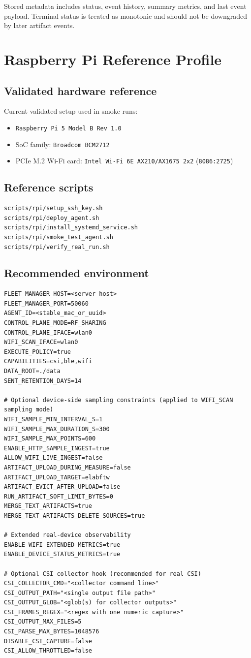 \documentclass[11pt,a4paper]{article}
\begin{document}
Stored metadata includes status, event history, summary metrics, and last event payload.
Terminal status is treated as monotonic and should not be downgraded by later artifact events.

\section{Raspberry Pi Reference Profile}
\subsection{Validated hardware reference}
Current validated setup used in smoke runs:
\begin{itemize}
  \item \texttt{Raspberry Pi 5 Model B Rev 1.0}
  \item SoC family: \texttt{Broadcom BCM2712}
  \item PCIe M.2 Wi-Fi card: \texttt{Intel Wi-Fi 6E AX210/AX1675 2x2} (\texttt{8086:2725})
\end{itemize}

\subsection{Reference scripts}
\begin{verbatim}
scripts/rpi/setup_ssh_key.sh
scripts/rpi/deploy_agent.sh
scripts/rpi/install_systemd_service.sh
scripts/rpi/smoke_test_agent.sh
scripts/rpi/verify_real_run.sh
\end{verbatim}

\subsection{Recommended environment}
\begin{verbatim}
FLEET_MANAGER_HOST=<server_host>
FLEET_MANAGER_PORT=50060
AGENT_ID=<stable_mac_or_uuid>
CONTROL_PLANE_MODE=RF_SHARING
CONTROL_PLANE_IFACE=wlan0
WIFI_SCAN_IFACE=wlan0
EXECUTE_POLICY=true
CAPABILITIES=csi,ble,wifi
DATA_ROOT=./data
SENT_RETENTION_DAYS=14

# Optional device-side sampling constraints (applied to WIFI_SCAN sampling mode)
WIFI_SAMPLE_MIN_INTERVAL_S=1
WIFI_SAMPLE_MAX_DURATION_S=300
WIFI_SAMPLE_MAX_POINTS=600
ENABLE_HTTP_SAMPLE_INGEST=true
ALLOW_WIFI_LIVE_INGEST=false
ARTIFACT_UPLOAD_DURING_MEASURE=false
ARTIFACT_UPLOAD_TARGET=elabftw
ARTIFACT_EVICT_AFTER_UPLOAD=false
RUN_ARTIFACT_SOFT_LIMIT_BYTES=0
MERGE_TEXT_ARTIFACTS=true
MERGE_TEXT_ARTIFACTS_DELETE_SOURCES=true

# Extended real-device observability
ENABLE_WIFI_EXTENDED_METRICS=true
ENABLE_DEVICE_STATUS_METRICS=true

# Optional CSI collector hook (recommended for real CSI)
CSI_COLLECTOR_CMD="<collector command line>"
CSI_OUTPUT_PATH="<single output file path>"
CSI_OUTPUT_GLOB="<glob(s) for collector outputs>"
CSI_FRAMES_REGEX="<regex with one numeric capture>"
CSI_OUTPUT_MAX_FILES=5
CSI_PARSE_MAX_BYTES=1048576
DISABLE_CSI_CAPTURE=false
CSI_ALLOW_THROTTLED=false
\end{verbatim}
\end{document}
